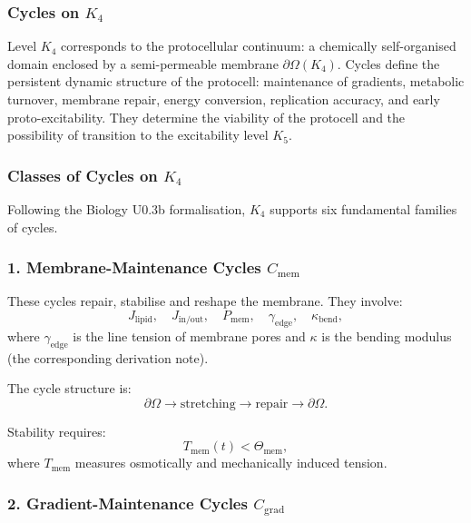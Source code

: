 
\subsubsection{Cycles on \texorpdfstring{$K_4$}{K_4}}
\label{sec:cycles-k4}

Level $K_4$ corresponds to the protocellular continuum:
a chemically self-organised domain enclosed by a semi-permeable
membrane $\partial\Omega(K_4)$.
Cycles define the persistent dynamic structure of the protocell:
maintenance of gradients, metabolic turnover, membrane repair,
energy conversion, replication accuracy, and early proto-excitability.
They determine the viability of the protocell and the possibility
of transition to the excitability level $K_5$.

\subsubsection{Classes of Cycles on \texorpdfstring{$K_4$}{K_4}}

Following the Biology U0.3b formalisation, $K_4$ supports six
fundamental families of cycles.

\subsubsection{1. Membrane-Maintenance Cycles $C_{\mathrm{mem}}$}

These cycles repair, stabilise and reshape the membrane.
They involve:
\[
  J_{\mathrm{lipid}},\quad
  J_{\mathrm{in/out}},\quad
  P_{\mathrm{mem}},\quad
  \gamma_{\mathrm{edge}},\quad
  \kappa_{\mathrm{bend}},
\]
where $\gamma_{\mathrm{edge}}$ is the line tension of membrane pores
and $\kappa$ is the bending modulus (the corresponding derivation note).

The cycle structure is:
\[
  \partial\Omega \to
  \mathrm{stretching} \to
  \mathrm{repair} \to
  \partial\Omega.
\]

Stability requires:
\[
  T_{\mathrm{mem}}(t) < \Theta_{\mathrm{mem}},
\]
where $T_{\mathrm{mem}}$ measures osmotically and mechanically
induced tension.

\subsubsection{2. Gradient-Maintenance Cycles $C_{\mathrm{grad}}$}

